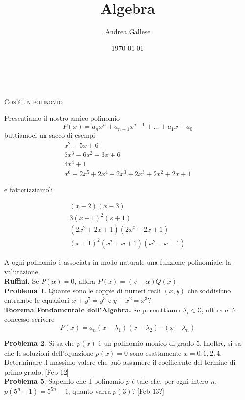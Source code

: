 \documentclass[a4paper]{article}
\title{Algebra}\let\Title\@title
\author{Andrea Gallese}\let\Author\@author
\date{\today}\let\Date\@date
\newcommand{\Intitola}{\begin{center}
		\vspace*{0,5 cm}
		{\Huge \textsc{\Title}} \\
		\vspace{0,5 cm}
		\textsc{\Author} \hspace{1cm} \textsc{\Date}
		\thispagestyle{empty}
		\vspace{0,7 cm}
\end{center}}
\theoremstyle{remark}
\theoremstyle{definition}
\begin{document}
\Intitola
\small
\begin{multicols}{2}
	\begin{center}
		\textsc{Cos'è un polinomio}
	\end{center}

	Presentiamo il nostro amico polinomio
	\[ P(x) = a_nx^n + a_{n-1}x^{n-1} + \dots + a_1 x + a_0 \]
	buttiamoci un sacco di esempi
	\begin{equation*}
	\begin{array}{c}
	x^2 - 5x +6\\
	3x^3 - 6x^2 -3x + 6\\
	4x^4 +1\\
	x^6 +2x^5 + 2x^4 +2x^3 + 2x^3 + 2x^2 + 2x +1
	\end{array}
	\end{equation*}
	
	e fattorizziamoli
	
	\begin{equation*}
	\begin{array}{c}
	(x-2)(x-3) \\
	3(x-1)^2(x+1) \\
	(2x^2 + 2x +1)(2x^2 -2x +1) \\
	(x+1)^2(x^2+x+1)(x^2-x+1)
	\end{array}
	\end{equation*}
	
	A ogni polinomio è associata in modo naturale una funzione polinomiale: la valutazione. \\
	
	\textbf{Ruffini.} Se $ P(\alpha) = 0 $, allora $ P(x) = (x-\alpha)Q(x) $. \\
	
	\textbf{Problema 1.} Quante sono le coppie di numeri reali $ (x,y) $ che soddisfano entrambe le equazioni $ x + y^2 = y^3 $ e $ y + x^2 = x^3 $? \\
	
	\textbf{Teorema Fondamentale dell'Algebra.} Se permettiamo $ \lambda_i \in \mathbb{C} $, allora ci è concesso scrivere
	\[ P(x) = a_n(x-\lambda_1)(x-\lambda_2) \cdots (x-\lambda_n) \]
	
	\textbf{Problema 2.} Si sa che $ p(x) $ è un polinomio monico di grado 5. Inoltre, si sa che le soluzioni dell’equazione $ p(x) = 0 $ sono esattamente $ x = 0, 1, 2, 4 $. Determinare il massimo valore che può assumere il coefficiente del termine di primo grado. [Feb 12]\\
	
	\textbf{Problema 5.} Sapendo che il polinomio $ p $ è tale che, per ogni intero $ n $, $ p(5^n - 1) = 5^{5n} - 1 $, quanto varrà $ p(3) $? [Feb 13?] \\
	

\end{multicols}
\end{document}
